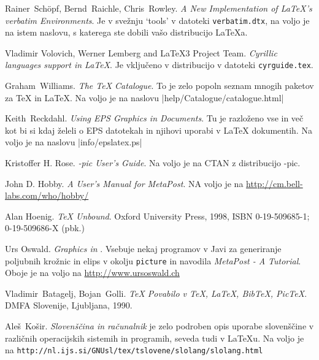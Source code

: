 \begin{thebibliography}{99}
 Rainer~Sch\"opf, Bernd~Raichle, Chris~Rowley.  
\newblock \emph{A New Implementation of \LaTeX's verbatim
  Environments}.
 \newblock Je v svežnju  `tools' v datoteki
  \texttt{verbatim.dtx},  na voljo je na istem naslovu, s katerega ste
dobili vašo distribucijo \LaTeX{}a.

 Vladimir Volovich, Werner Lemberg and \LaTeX3 Project Team.                    
    \newblock \emph{Cyrillic languages support in \LaTeX}.                                        
    \newblock Je vključeno v distribucijo \LaTeXe{} 
   v datoteki                                          
  \texttt{cyrguide.tex}.                                                                          

 Graham~Williams.  \newblock \emph{The TeX
    Catalogue}. To je zelo popoln seznam 
    mnogih paketov za \TeX{} in \LaTeX{}.
  \newblock Na voljo je na naslovu
\CTAN|help/Catalogue/catalogue.html|
  
 Keith~Reckdahl.  \newblock \emph{Using EPS Graphics in
    \LaTeXe{} Documents}. Tu je razloženo vse in več kot bi si kdaj želeli
o EPS datotekah in njihovi uporabi v \LaTeX{}
  dokumentih.  \newblock Na voljo je na naslovu
  \CTAN|info/epslatex.ps|

 Kristoffer H. Rose.
  \newblock \emph{\Xy-pic User's Guide}.  \newblock
  Na voljo je na CTAN z distribucijo \Xy-pic.
  
 John D. Hobby.
  \newblock \emph{A User's Manual for MetaPost}. \newblock
  NA voljo je na \url{http://cm.bell-labs.com/who/hobby/} 
  
 Alan Hoenig.
  \newblock \emph{\TeX{} Unbound}. \newblock Oxford University Press, 1998,
    ISBN 0-19-509685-1; 0-19-509686-X (pbk.) 
  
 Urs Oswald.  
    \newblock \emph{Graphics in \LaTeXe{}}.
   Vsebuje nekaj programov v Javi za generiranje poljubnih krožnic in
elips v okolju \texttt{picture} in navodila
  \emph{MetaPost - A Tutorial}.
  \newblock Oboje je na voljo na \url{http://www.ursoswald.ch}
  
 Vladimir~Batagelj, Bojan~Golli. \newblock \emph{\TeX{} Povabilo v TeX, LaTeX, BibTeX, PicTeX}.
   \newblock DMFA Slovenije, Ljubljana, 1990. 

 Aleš~Košir.  \newblock \emph{Slovenščina in računalnik} 
    je zelo podroben opis uporabe slovenščine v različnih operacijskih sistemih in programih,
    seveda tudi v \LaTeX{}u.
  \newblock Na voljo je na \texttt{http://nl.ijs.si/GNUsl/tex/tslovene/slolang/slolang.html}
 

\end{thebibliography}


%

